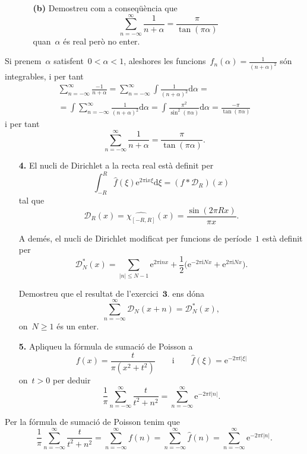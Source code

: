 \documentclass[a4paper]{article}
\theoremstyle{plain}
\newcommand{\iu}{\mathrm{i}}
\newcommand{\e}{\mathrm{e}}
\providecommand{\uppi}{\pi}
\newcommand{\diff}{\mathrm{d}}
\newcommand{\abs}[1]{\lvert{#1}\rvert}
\newcommand{\D}{\mathcal{D}}
\begin{document}
\begin{enumerate}
    \item[]\begin{enumerate}
        \item[\textbf{(b)}] Demostreu com a conseqüència que
            \[
                \sum_{n=-\infty}^{\infty} \frac{1}{n+\alpha}
                = \frac{\uppi}{\tan(\uppi\alpha)}
            \]
            quan~\(\alpha\) és real però no enter.
    \end{enumerate}
\end{enumerate}

Si prenem~\(\alpha\) satisfent~\(0<\alpha<1\), aleshores les
funcions~\(f_{n}(\alpha)=\frac{1}{(n+\alpha)^{2}}\) són integrables, i per tant
\begin{multline*}
    \sum_{n=-\infty}^{\infty}
    \frac{-1}{n+\alpha}
    =
    \sum_{n=-\infty}^{\infty}
    \int
    \frac{1}{(n+\alpha)^{2}}
    \diff\alpha
    = \\ =
    \int
    \sum_{n=-\infty}^{\infty}
    \frac{1}{(n+\alpha)^{2}}
    \diff\alpha
    =
    \int
    \frac{\uppi^{2}}{\sin^{2}(\uppi\alpha)}
    \diff\alpha
    =
    \frac{-\uppi}{\tan(\uppi\alpha)}
\end{multline*}
i per tant
\[
    \sum_{n=-\infty}^{\infty} \frac{1}{n+\alpha}
    = \frac{\uppi}{\tan(\uppi\alpha)}.
\]

\begin{enumerate}
    \item[\textbf{4.}] El nucli de Dirichlet a la recta real està definit per
        \[
            \int_{-R}^{R}\widehat{f}(\xi)\e^{2\uppi\iu x\xi}\diff\xi
            = (f\ast \D_{R})(x)
        \]
        tal que
        \[
            \D_{R}(x) = \widehat{\chi_{[-R,R]}}(x)
            = \frac{\sin(2\uppi Rx)}{\uppi x}.
        \]

        A demés, el nucli de Dirichlet modificat per funcions de període~\(1\)
        està definit per
        \[
            \D^{\ast}_{N}(x)
            = \sum_{\abs{n} \leq N-1} \e^{2\uppi\iu nx}
            + \frac{1}{2}\bigl(\e^{-2\uppi\iu Nx} + \e^{2\uppi\iu Nx}\bigr).
        \]

        Demostreu que el resultat de l'exercici~\(\textbf{3.}\) ens dóna
        \[
            \sum_{n=-\infty}^{\infty} \D_{N}(x+n) = \D^{\ast}_{N}(x),
        \]
        on~\(N\geq1\) és un enter.
\end{enumerate}

\begin{enumerate}
    \item[\textbf{5.}] Apliqueu la fórmula de sumació de Poisson a
        \[
            f(x) = \frac{t}{\uppi(x^{2}+t^{2})}
            \qquad
            \text{i}
            \qquad
            \widehat{f}(\xi) = \e^{-2\uppi t\abs{\xi}}
        \]
        on~\(t>0\) per deduir
        \[
            \frac{1}{\uppi}
            \sum_{n=-\infty}^{\infty}
            \frac{t}{t^{2}+n^{2}}
            =
            \sum_{n=-\infty}^{\infty}
            \e^{-2\uppi t\abs{n}}.
        \]
\end{enumerate}

Per la fórmula de sumació de Poisson tenim que
\[
    \frac{1}{\uppi}
    \sum_{n=-\infty}^{\infty}
    \frac{t}{t^{2}+n^{2}}
    =
    \sum_{n=-\infty}^{\infty} f(n)
    =
    \sum_{n=-\infty}^{\infty} \widehat{f}(n)
    =
    \sum_{n=-\infty}^{\infty}
    \e^{-2\uppi t\abs{n}}.
\]
\end{document}

